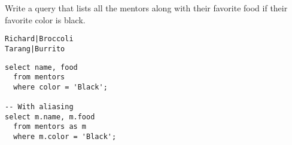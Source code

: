 \begin{blocksection}
\question Write a query that lists all the mentors along with their favorite food if their favorite color is black.

\begin{lstlisting}
Richard|Broccoli
Tarang|Burrito
\end{lstlisting}

\begin{solution}[1in]
\begin{lstlisting}
select name, food
  from mentors
  where color = 'Black';

-- With aliasing
select m.name, m.food
  from mentors as m
  where m.color = 'Black';
\end{lstlisting}
\end{solution}
\end{blocksection}
